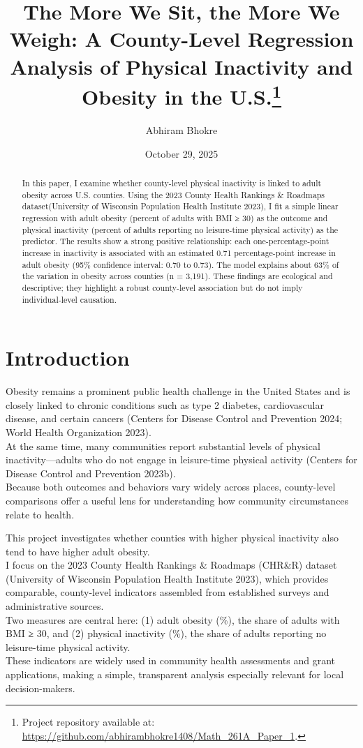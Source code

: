 \documentclass[
  letterpaper,
  DIV=11,
  numbers=noendperiod]{scrartcl}
\title{The More We Sit, the More We Weigh: A County-Level Regression
Analysis of Physical Inactivity and Obesity in the U.S.\thanks{Project
repository available at:
\url{https://github.com/abhirambhokre1408/Math_261A_Paper_1}.}}
\author{Abhiram Bhokre}
\date{October 29, 2025}
\begin{document}
\maketitle
\begin{abstract}
In this paper, I examine whether county-level physical inactivity is
linked to adult obesity across U.S. counties. Using the 2023 County
Health Rankings \& Roadmaps dataset(University of Wisconsin Population
Health Institute 2023), I fit a simple linear regression with adult
obesity (percent of adults with BMI ≥ 30) as the outcome and physical
inactivity (percent of adults reporting no leisure-time physical
activity) as the predictor. The results show a strong positive
relationship: each one-percentage-point increase in inactivity is
associated with an estimated 0.71 percentage-point increase in adult
obesity (95\% confidence interval: 0.70 to 0.73). The model explains
about 63\% of the variation in obesity across counties (n = 3,191).
These findings are ecological and descriptive; they highlight a robust
county-level association but do not imply individual-level causation.
\end{abstract}


\section{Introduction}\label{introduction}

Obesity remains a prominent public health challenge in the United States
and is closely linked to chronic conditions such as type 2 diabetes,
cardiovascular disease, and certain cancers (Centers for Disease Control
and Prevention 2024; World Health Organization 2023).\\
At the same time, many communities report substantial levels of physical
inactivity---adults who do not engage in leisure-time physical activity
(Centers for Disease Control and Prevention 2023b).\\
Because both outcomes and behaviors vary widely across places,
county-level comparisons offer a useful lens for understanding how
community circumstances relate to health.

This project investigates whether counties with higher physical
inactivity also tend to have higher adult obesity.\\
I focus on the 2023 County Health Rankings \& Roadmaps (CHR\&R) dataset
(University of Wisconsin Population Health Institute 2023), which
provides comparable, county-level indicators assembled from established
surveys and administrative sources.\\
Two measures are central here: (1) adult obesity (\%), the share of
adults with BMI ≥ 30, and (2) physical inactivity (\%), the share of
adults reporting no leisure-time physical activity.\\
These indicators are widely used in community health assessments and
grant applications, making a simple, transparent analysis especially
relevant for local decision-makers.
\end{document}
